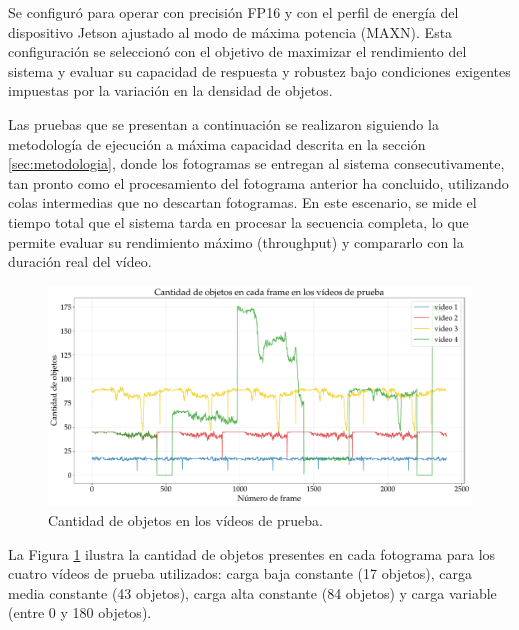 \documentclass[11pt,spanish,listoffigures,listoftables]{tfgetsinf}
\begin{document}
Se configuró para operar con precisión FP16 y con el perfil de energía del dispositivo Jetson ajustado al modo de máxima potencia (MAXN). Esta configuración se seleccionó con el objetivo de maximizar el rendimiento del sistema y evaluar su capacidad de respuesta y robustez bajo condiciones exigentes impuestas por la variación en la densidad de objetos.

Las pruebas que se presentan a continuación se realizaron siguiendo la metodología de ejecución a máxima capacidad descrita en la sección \ref{sec:metodologia}, donde los fotogramas se entregan al sistema consecutivamente, tan pronto como el procesamiento del fotograma anterior ha concluido, utilizando colas intermedias que no descartan fotogramas. En este escenario, se mide el tiempo total que el sistema tarda en procesar la secuencia completa, lo que permite evaluar su rendimiento máximo (throughput) y compararlo con la duración real del vídeo.

\begin{figure}[H]
   \centering
   \includegraphics[width=\linewidth]{excels/inferencia/cantidad_objetos/cantidad_objetos_videos.pdf}
   \caption[Cantidad de objetos en los vídeos de prueba]{Cantidad de objetos en los vídeos de prueba.}
   \label{fig:4_videos}
\end{figure}

La Figura \ref{fig:4_videos} ilustra la cantidad de objetos presentes en cada fotograma para los cuatro vídeos de prueba utilizados: carga baja constante (17 objetos), carga media constante (43 objetos), carga alta constante (84 objetos) y carga variable (entre 0 y 180 objetos).
\end{document}
